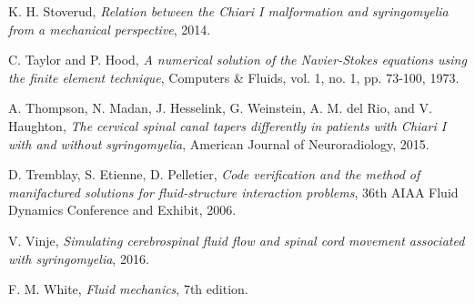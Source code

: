 \documentclass[a4paper,11pt,openright,twoside]{book}
\begin{document}
\begin{thebibliography}{100}
 K. H. Stoverud, \emph{Relation between the Chiari I malformation and syringomyelia from a mechanical perspective}, 2014.

 C. Taylor and P. Hood, \emph{A numerical solution of the Navier-Stokes equations using the finite element technique}, Computers \& Fluids, vol. 1, no. 1, pp. 73-100, 1973.

 A. Thompson, N. Madan, J. Hesselink, G. Weinstein, A. M. del Rio, and V. Haughton, \emph{The cervical spinal canal tapers differently in patients with Chiari I with and without syringomyelia}, American Journal of Neuroradiology, 2015.

 D. Tremblay, S. Etienne, D. Pelletier, \emph{Code verification and the method of manifactured solutions for fluid-structure interaction problems}, 36th AIAA Fluid Dynamics Conference and Exhibit, 2006.

 V. Vinje, \emph{Simulating cerebrospinal fluid flow and spinal cord movement associated with syringomyelia}, 2016.

 F. M. White, \emph{Fluid mechanics}, 7th edition.


\end{thebibliography}
\end{document}
